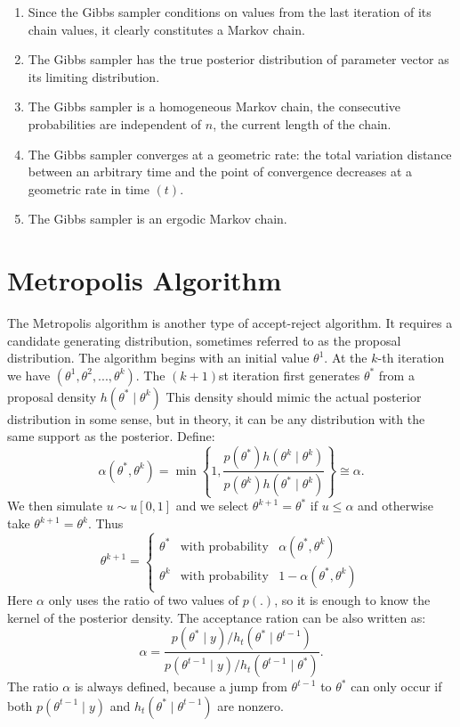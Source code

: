 \documentclass[lecture,12pt,]{pcms-l}
\numberwithin{section}{chapter}
\numberwithin{equation}{chapter}
\theoremstyle{plain}
\theoremstyle{definition}
\theoremstyle{definition}
\begin{document}
\begin{enumerate}
\item Since the Gibbs sampler conditions on values from the last iteration of its chain values, it clearly constitutes a Markov chain.
\item The Gibbs sampler has the true posterior distribution of parameter vector as its limiting distribution.
\item The Gibbs sampler is a homogeneous Markov chain, the consecutive probabilities are independent of $n$, the current length of the chain.
\item The Gibbs sampler converges at a geometric rate: the total variation distance between an arbitrary time and the point of convergence decreases at a geometric rate in time $(t)$.
\item The Gibbs sampler is an ergodic Markov chain. 
\end{enumerate}
\section{Metropolis Algorithm}
The Metropolis algorithm\cite{Hoff} is another type of accept-reject algorithm. It requires a candidate generating distribution, sometimes referred to as the proposal distribution. The algorithm begins with an initial value $\theta^1$. At the $k$-th iteration we have $(\theta^1,\theta^2,...,\theta^k)$. The $(k+1)$st iteration first generates $\theta^*$ from a proposal density $h(\theta^* \mid \theta^k)$ This density should mimic the actual posterior distribution in some sense, but in theory, it can be any distribution with the same support as the posterior. Define:
\begin{equation}
\alpha(\theta^*,\theta^k)= \min\left \{ 1, \frac{p(\theta^*)h(\theta^k \mid \theta^k)}{p(\theta^k)h(\theta^* \mid \theta^k)}  \right \} \cong \alpha.
\end{equation} 
We then simulate $u \sim u \left [ 0,1 \right ]$ and we select $\theta^{k+1}=\theta^*$ if $u \leq \alpha$ and otherwise take $\theta^{k+1}=\theta^k$. Thus
\begin{equation}
\theta^{k+1}= 
\left\{\begin{matrix}
\theta^* & \text{with probability} & \alpha(\theta^*,\theta^k)\\ 
\theta^{k} & \text{with probability} & 1- \alpha(\theta^*,\theta^k) 
\end{matrix}\right.
\end{equation}
Here $\alpha$ only uses the ratio of two values of $p(.)$, so it is enough to know the kernel of the posterior density. The acceptance ration can be also written as:
\begin{equation}
\alpha=\frac{p(\theta^* \mid y)/h_t(\theta^* \mid \theta^{t-1})}{p(\theta^{t-1} \mid y)/h_t(\theta^{t-1} \mid \theta^{*})}.
\end{equation}
The ratio $\alpha$ is always defined, because a jump from $\theta^{t-1}$ to $\theta^*$ can only occur if both $p(\theta^{t-1}\mid y)$ and $h_t(\theta^* \mid \theta^{t-1})$ are nonzero.
\end{document}
